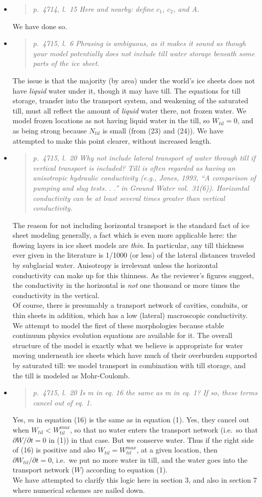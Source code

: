 \documentclass[11pt,reqno]{amsart}
\newcommand{\reply}[2]{
\medskip\medskip
\item  \begin{quote}
\emph{#1}
\end{quote}

\medskip
\noindent #2}
\begin{document}
\begin{itemize}
\reply{p.~4714, l.~15 Here and nearby: define $c_1$, $c_2$, and A.}
{We have done so.}

\reply{p.~4715, l.~6 Phrasing is ambiguous, as it makes it sound as though your model
potentially does not include till water storage beneath some parts of the ice sheet.}
{The issue is that the majority (by area) under the world's ice sheets does not have \emph{liquid} water under it, though it may have till.  The equations for till storage, transfer into the transport system, and weakening of the saturated till, must all reflect the amount of \emph{liquid} water there, not frozen water.  We model frozen locations as not having liquid water in the till, so $W_{til}=0$, and as being strong because $N_{til}$ is small (from (23) and (24)).  We have attempted to make this point clearer, without increased length.}

\reply{p.~4715, l.~20 Why not include lateral transport of water through till if vertical transport is included?  Till is often regarded as having an anisotropic hydraulic conductivity (e.g., Jones, 1993, ``A comparison of pumping and slug tests. . .'' in Ground Water vol.~31(6)).  Horizontal conductivity can be at least several times greater than vertical conductivity.}
{The reason for not including horizontal transport is the standard fact of ice sheet modeling generally, a fact which is even more applicable here: the flowing layers in ice sheet models are \emph{thin}.  In particular, any till thickness ever given in the literature is 1/1000 (or less) of the lateral distances traveled by subglacial water.  Anisotropy is irrelevant unless the horizontal conductivity can make up for this thinness.  As the reviewer's figures suggest, the conductivity in the horizontal is \emph{not} one thousand or more times the conductivity in the vertical.\\
\indent Of course, there is presumably a transport network of cavities, conduits, or thin sheets in addition, which has a low (lateral) macroscopic conductivity.  We attempt to model the first of these morphologies because stable continuum physics evolution equations are available for it.  The overall structure of the model is exactly what we believe is appropriate for water moving underneath ice sheets which have much of their overburden supported by saturated till: we model transport in combination with till storage, and the till is modeled as Mohr-Coulomb.}

\reply{p.~4715, l.~20 Is m in eq. 16 the same as m in eq. 1?  If so, these terms cancel out of
eq. 1.}
{Yes, $m$ in equation (16) is the same as in equation (1).  Yes, they cancel out when $W_{til}< W_{til}^{max}$, so that no water enters the transport network (i.e.~so that $\partial W/\partial t=0$ in (1)) in that case.  But we conserve water.  Thus if the right side of (16) is positive and also $W_{til} = W_{til}^{max}$, at a given location, then $\partial W_{til}/\partial t=0$, i.e.~we put no more water in till, and the water goes into the transport network ($W$) according to equation (1). \\
\indent We have attempted to clarify this logic here in section 3, and also in section 7 where numerical schemes are nailed down.}


\end{itemize}
\end{document}
